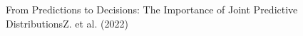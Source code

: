 \documentclass[preview]{standalone}
\begin{document}
\begin{center}
From Predictions to Decisions: The Importance of Joint Predictive Distributions\Wen Z. et al. (2022)
\end{center}
\end{document}

